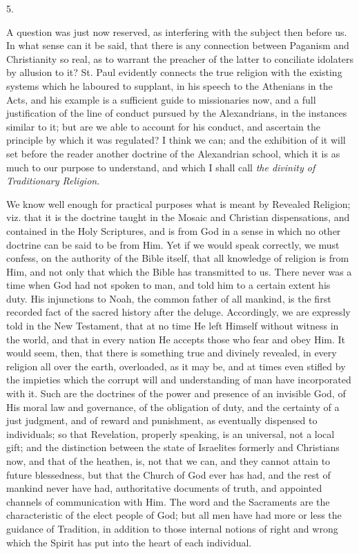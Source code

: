 5.

A question was just now reserved, as interfering with the subject
then before us. In what sense can it be said, that there is any
connection between Paganism and Christianity so real, as to warrant
the preacher of the latter to conciliate idolaters by allusion to it?
St. Paul evidently connects the true religion with the existing
systems which he laboured to supplant, in his speech to the Athenians
in the Acts, and his example is a sufficient guide to missionaries
now, and a full justification of the line of conduct pursued by the
Alexandrians, in the instances similar to it; but are we able to
account for his conduct, and ascertain the principle by which it was
regulated? I think we can; and the exhibition of it will set before
the reader another doctrine of the Alexandrian school, which it is as
much to our purpose to understand, and which I shall call \emph{the
divinity of Traditionary Religion}.

We know well enough for practical purposes what is meant by
Revealed Religion; viz. that it is the doctrine taught in the Mosaic
and Christian dispensations, and contained in the Holy Scriptures, and
is from God in a sense in which no other doctrine can be said to be
from Him. Yet if we would speak correctly, we must confess, on the
authority of the Bible itself, that all knowledge of religion is from
Him, and not only that which the Bible has transmitted to us.
There never was a time when God had not spoken to man, and told him to
a certain extent his duty. His injunctions to Noah, the common father
of all mankind, is the first recorded fact of the sacred history after
the deluge. Accordingly, we are expressly told in the New Testament,
that at no time He left Himself without witness in the world, and that
in every nation He accepts those who fear and obey Him. It would seem,
then, that there is something true and divinely revealed, in every
religion all over the earth, overloaded, as it may be, and at times
even stifled by the impieties which the corrupt will and understanding
of man have incorporated with it. Such are the doctrines of the power
and presence of an invisible God, of His moral law and governance, of
the obligation of duty, and the certainty of a just judgment, and of
reward and punishment, as eventually dispensed to individuals; so that
Revelation, properly speaking, is an universal, not a local gift; and
the distinction between the state of Israelites formerly and
Christians now, and that of the heathen, is, not that we can, and they
cannot attain to future blessedness, but that the Church of God ever
has had, and the rest of mankind never have had, authoritative
documents of truth, and appointed channels of communication with Him.
The word and the Sacraments are the characteristic of the elect people
of God; but all men have had more or less the guidance of Tradition,
in addition to those internal notions of right and wrong which the
Spirit has put into the heart of each individual.

